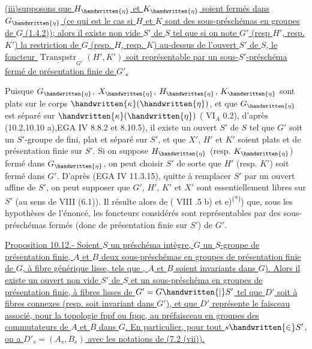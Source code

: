 \uline{(iii)supposons que $H_{\handwritten{\eta}}$ et $K_{\handwritten{\eta}}$ soient fermés dans $G_{\handwritten{\eta}}$ (ce qui est le cas si $H$ et $K$ sont des sous-préschémas en groupes de $G$ (1.4.2)); alors il existe  non vide $S'$ de $S$ tel que si on note $G'$ (resp $H'$, resp. $K'$) la restriction de $G$ (resp. $H$, resp. $K$) au-dessus de l'ouvert $S'$ de $S$, le foncteur $\underline{\operatorname{Transpstr}}_{G'}(H',K')$ soit représentable par un sous-$S'$-préschéma fermé de présentation finie de $G'$.}

Puisque $G_{\handwritten{\eta}}$, $X_{\handwritten{\eta}}$, $H_{\handwritten{\eta}}$, $K_{\handwritten{\eta}}$ sont plats sur le corps $\handwritten{\kappa}(\handwritten{\eta})$, et que
$G_{\handwritten{\eta}}$ est séparé sur $\handwritten{\kappa}(\handwritten{\eta})$ ( $\mathrm{VI}_A$ 0.2), d'après (10.2,10.10 a),EGA IV 8.8.2 et 8.10.5), il existe un ouvert $S'$ de $S$ tel que $G'$ soit un $S'$-groupe de  fini, plat et séparé sur $S'$, et que $X'$, $H'$ et $K'$ soient plats et de présentation finie sur $S'$. Si on suppose $H_{\handwritten{\eta}}$ (resp. $K_{\handwritten{\eta}}$) fermé dans $G_{\handwritten{\eta}}$, on peut choisir $S'$ de sorte que $H'$ (resp. $K'$) soit fermé dans $G'$. D'après (EGA IV 11.3.15), quitte à remplacer $S'$ par un ouvert affine de $S'$, on peut supposer que $G'$, $H'$, $K'$ et $X'$ sont essentiellement libres sur $S'$ (au sens de  VIII (6.1)). Il résulte alors de ( VIII .5 b) et e)\textsuperscript{(*)}) que, sous les hypothèses de l'énoncé, les foncteurs considérés sont représentables par des sous-préschémas fermés (donc de présentation finie sur $S'$) de $G'$.

\uline{Proposition 10.12.- Soient $S$ un préschéma intègre, $G$ un  $S$-groupe de présentation finie, $A$ et $B$ deux sous-préschémas en groupes de présentation finie de $G$, à fibre générique lisse, tels que ,  $A$ et $B$ soient invariants dans $G$). Alors il existe un ouvert non vide $S'$ de $S$ et un sous-préschéma en groupes de présentation finie, à fibres lisses  de $G'=G\handwritten{|}S'$\handwritten{,} tel que $D'$ soit  à fibres connexes (resp. soit invariant dans $G'$), et que $D'$ représente le faisceau associé, pour la topologie fppf ou fpqc, au préfaisceau en groupes des commutateurs de $A$ et $B$ dans $G$. En particulier, pour tout $s\handwritten{\in}S'$, on a $D'_s=(A_s,B_s)$ avec les notations de (7.2 (vii)).}

